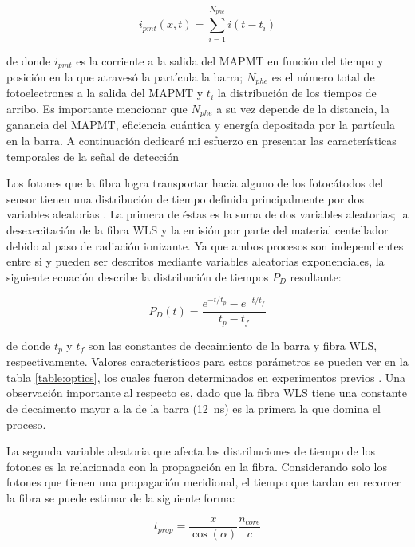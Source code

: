 \begin{equation}
\label{equ:current-pulse}
i_{pmt}\left(x,t\right)=\sum_{i=1}^{N_{phe}}i\left(t-t_{i}\right)
\end{equation}

de donde $i_{pmt}$ es la corriente a la salida del MAPMT en función del tiempo y posición en la que atravesó la partícula la barra; $N_{phe}$ es el número total de fotoelectrones a la salida del MAPMT y $t_{i}$ la distribución de los tiempos de arribo. Es importante mencionar que $N_{phe}$ a su vez depende de la distancia, la ganancia del MAPMT, eficiencia cuántica y energía depositada por la partícula en la barra. A continuación dedicaré mi esfuerzo en presentar las características temporales de la señal de detección

Los fotones que la fibra logra transportar hacia alguno de los fotocátodos del sensor tienen una distribución de tiempo definida principalmente por dos variables aleatorias \cite{sanchez10}. La primera de éstas es la suma de dos variables aleatorias; la desexecitación de la fibra WLS y la emisión por parte del material centellador debido al paso de radiación ionizante. Ya que ambos procesos son independientes entre si y pueden ser descritos mediante variables aleatorias exponenciales, la siguiente ecuación describe la distribución de tiempos $P_{D}$ resultante:

\begin{equation}
\label{equ:exponential-decay}
P_{D}(t)=\frac{e^{-t/t_{p}}-e^{-t/t_{f}}}{t_{p}-t_{f}}
\end{equation}

de donde $t_{p}$ y $t_{f}$ son las constantes de decaimiento de la barra y fibra WLS, respectivamente. Valores característicos para estos parámetros se pueden ver en la tabla \ref{table:optics}, los cuales fueron  determinados en experimentos previos \cite{gros18,mineev11}. Una observación importante al respecto es, dado que la fibra WLS tiene una constante de decaimento mayor a la de la barra (\SI{12}{\nano\second}) es la primera la que domina el proceso.

La segunda variable aleatoria que afecta las distribuciones de tiempo de los fotones es la relacionada con la propagación en la fibra. Considerando solo los fotones que tienen una propagación meridional, el tiempo que tardan en recorrer la fibra se puede estimar de la siguiente forma:

\begin{equation}
\label{equ:meridional}
t_{prop}=\frac{x}{\cos(\alpha)}\frac{n_{core}}{c}
\end{equation}

